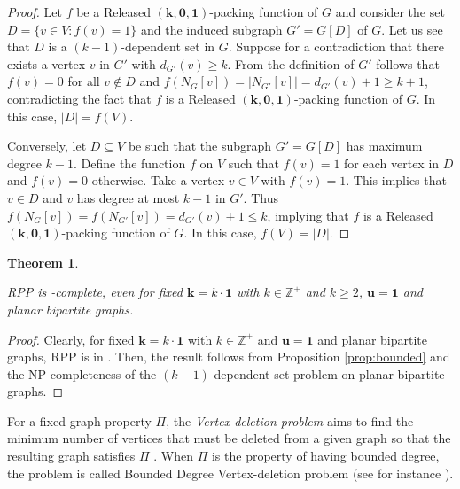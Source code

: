 \documentclass[preprint,12pt]{article}
\renewcommand{\leq}{\leqslant}
\renewcommand{\geq}{\geqslant}
\newtheorem{theorem}{Theorem}[section]
\theoremstyle{definition}
\begin{document}
 
\begin{proof}
   Let $f$ be a Released $(\mathbf{k}, \mathbf{0}, \mathbf{1})$-packing function of  $G$ and consider the set  $D=\{v\in V:f(v)=1\}$ and the induced subgraph $G'=G[D]$ of $G$. Let us see that $D$ is a $(k-1)$-dependent set in $G$. 
Suppose for a contradiction that there exists a vertex $v$ in $G'$ with $d_{G'}(v) \geq k$. From the definition of $G'$ follows that $f(v)=0$ for all $v\notin D$ and $f(N_G[v])=|N_{G'}[v]|=d_{G'}(v)+1 \geq k +1$, contradicting the fact that $f$ is a Released $(\mathbf{k}, \mathbf{0}, \mathbf{1})$-packing function of $G$. In this case, $|D|=f(V)$. 
  
   Conversely, let $D \subseteq V$ be such that the subgraph $G'=G[D]$ has maximum degree $k-1$.  Define the function $f$ on $V$ such that $f(v)=1$ for each vertex in $D$ and $f(v)=0$ otherwise.     
   Take a vertex $v\in V$ with  $f(v)=1$. This implies that $v \in D$  and $v$ has degree at most $k-1$ in $G'$. Thus   $f(N_G[v])= f(N_{G'}[v])= d_{G'}(v)+1 \leq k$, implying that $f$ is a Released $(\mathbf{k}, \mathbf{0}, \mathbf{1})$-packing function of $G$. In this case,  $f(V)=|D|$. \end{proof}

\begin{theorem}\label{vertexdeletion}

 RPP is -complete, even for fixed  $\mathbf{k}=k\cdot \mathbf{1}$ with $ k \in \mathbb{Z}^+$ and  $k\geq 2$, $\mathbf{u}=\mathbf{1}$ and  planar bipartite graphs.
 \end{theorem}

\begin{proof}
Clearly, for fixed $\mathbf{k}=k\cdot \mathbf{1}$ with $ k \in \mathbb{Z}^+$  and $\mathbf{u}=\mathbf{1}$ and  planar bipartite graphs, RPP is in . 
Then, the result follows from Proposition \ref{prop:bounded} and the NP-completeness of the $(k-1)$-dependent set problem on planar bipartite graphs. 

\end{proof}



 For a fixed graph property $\Pi$, the \emph{Vertex-deletion problem} aims to find the minimum number of  vertices that must be deleted  from a given graph so that the resulting graph  satisfies $\Pi$ \cite{Lewis1980}. When $\Pi$ is the property of having bounded degree, the problem is called Bounded Degree Vertex-deletion problem (see for instance  \cite{Betzler2012}).
\end{document}
